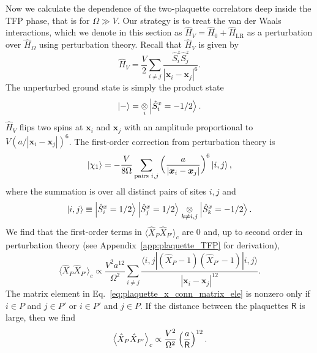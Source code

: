 \documentclass[twocolumn,superscriptaddress,amsmath,amssymb,aps,prx,nofootinbib]{revtex4-2}
\begin{document}
Now we calculate the dependence of the two-plaquette correlators deep inside the TFP phase, that is for $\Omega \gg V$. Our strategy is to treat the van der Waals interactions, which we denote in this section as $\hat{H}_V = \hat{H}_0 + \hat{H}_{\text{LR}}$ as a perturbation over $\hat{H}_\Omega$ using  perturbation theory. Recall that $\hat{H}_V$ is given by 
\begin{equation}
\label{eq:H_V}
    \hat{H}_V = \frac{V}{2} \sum_{i\neq j} \frac{\hat{S}_i^z \hat{S}_j^z}{|\bm{x}_i - \bm{x}_j|^6}.
\end{equation}
The unperturbed ground state is simply the product state
\begin{equation}
\label{eq:minus_state_def}
    \ket{-} =  \underset{i}{\otimes} \ket{\hat{S}^x_i = -1/2}.
\end{equation}
$\hat{H}_V$ flips two spins at $\bm{x}_i$ and $\bm{x}_j$ with an amplitude proportional to $V \left( a /|\bm{x}_i - \bm{x}_j | \right)^6$. The first-order correction from perturbation theory is
\begin{equation}
\label{eq:tfp_state_pert1}
    \ket{\chi_1} = -\frac{V}{8\Omega} \sum_{\text{pairs }i,j} \left( \frac{a}{|\bm{x}_i -\bm{x}_j|} \right)^6 \ket{i,j} ,
\end{equation}
where the summation is over all distinct pairs of sites $i, j$ and
\begin{equation}
    \ket{i,j} \equiv \ket{\hat{S}^x_i = 1/2}\ket{\hat{S}^x_j = 1/2} \underset{k \neq i,j}{\otimes}  \ket{\hat{S}^x_k = -1/2}.
\end{equation}
We find that the first-order terms in $\langle \hat{X}_P \hat{X}_{P'} \rangle_c$ are 0 and, up to second order in perturbation theory (see Appendix~\ref{app:plaquette_TFP} for derivation),
\begin{equation}
\label{eq:plaquette_x_conn_matrix_ele}
        \langle \hat{X}_P \hat{X}_{P'}  \rangle_{c} \propto \frac{V^2 a^{12}}{ \Omega^2}  \sum_{i\neq j} \frac{\langle i, j | \left( \hat{X}_P -1\right) \left(   \hat{X}_{P'} -1 \right) | i, j \rangle }{| \bm{x}_i - \bm{x}_j|^{12} }.
\end{equation}
The matrix element in Eq.~\eqref{eq:plaquette_x_conn_matrix_ele} is nonzero only if $i \in P$ and $j \in P'$ or $i \in P'$ and $j \in P$. 
If the distance between the plaquettes $\mathsf{R}$ is large, then we find
\begin{equation}
\label{eq:deep_tfp_state}
    \expval{ \hat{X}_P \hat{X}_{P'} }_{c} \propto \frac{V^2}{\Omega^2 } \left( \frac{a}{\mathsf{R}} \right)^{12}.
\end{equation}
\end{document}
